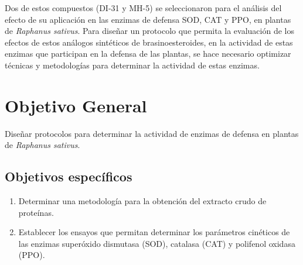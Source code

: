 Dos de estos compuestos (DI-31 y MH-5) se seleccionaron para el an\'alisis del efecto de su aplicaci\'on en las enzimas de defensa SOD, CAT y PPO, en plantas de \textit{Raphanus sativus}. Para dise\~nar un protocolo que permita la evaluaci\'on de los efectos de estos an\'alogos sint\'eticos de brasinoesteroides, en la actividad de estas enzimas que participan en la defensa de las plantas, se hace necesario optimizar t\'ecnicas y metodolog\'ias para determinar la actividad de estas enzimas. 











\chapter*{Objetivo General}  

Dise\~{n}ar protocolos para determinar la actividad de enzimas de defensa en plantas de \textit{Raphanus sativus}.\\

\section*{Objetivos específicos}

\begin{enumerate}
\item Determinar una metodolog\'ia para la obtenci\'on del extracto crudo de prote\'inas.
\item Establecer los ensayos que permitan determinar los par\'ametros cin\'eticos de las enzimas super\'oxido dismutasa (SOD), catalasa (CAT) y polifenol oxidasa (PPO).
\end{enumerate}

